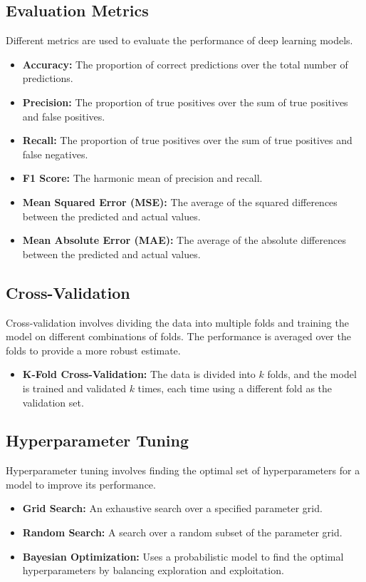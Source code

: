 \subsection{Evaluation Metrics}
Different metrics are used to evaluate the performance of deep learning models.

\begin{itemize}
    \item \textbf{Accuracy:} The proportion of correct predictions over the total number of predictions.
    \item \textbf{Precision:} The proportion of true positives over the sum of true positives and false positives.
    \item \textbf{Recall:} The proportion of true positives over the sum of true positives and false negatives.
    \item \textbf{F1 Score:} The harmonic mean of precision and recall.
    \item \textbf{Mean Squared Error (MSE):} The average of the squared differences between the predicted and actual values.
    \item \textbf{Mean Absolute Error (MAE):} The average of the absolute differences between the predicted and actual values.
\end{itemize}

\subsection{Cross-Validation}
Cross-validation involves dividing the data into multiple folds and training the model on different combinations of folds. The performance is averaged over the folds to provide a more robust estimate.

\begin{itemize}
    \item \textbf{K-Fold Cross-Validation:} The data is divided into \( k \) folds, and the model is trained and validated \( k \) times, each time using a different fold as the validation set.
\end{itemize}

\subsection{Hyperparameter Tuning}
Hyperparameter tuning involves finding the optimal set of hyperparameters for a model to improve its performance.

\begin{itemize}
    \item \textbf{Grid Search:} An exhaustive search over a specified parameter grid.
    \item \textbf{Random Search:} A search over a random subset of the parameter grid.
    \item \textbf{Bayesian Optimization:} Uses a probabilistic model to find the optimal hyperparameters by balancing exploration and exploitation.
\end{itemize}


